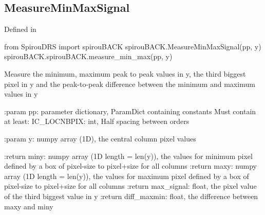 \begin{minipage}{\textwidth}
\subsection{MeasureMinMaxSignal}

Defined in \spirouBACK{}

\begin{pythonbox}
from SpirouDRS import spirouBACK
spirouBACK.MeasureMinMaxSignal(pp, y)
spirouBACK.spirouBACK.measure_min_max(pp, y)
\end{pythonbox}

\begin{pythondocstring}
Measure the minimum, maximum peak to peak values in y, the third biggest
pixel in y and the peak-to-peak difference between the minimum and
maximum values in y

:param pp: parameter dictionary, ParamDict containing constants
            Must contain at least:
                IC_LOCNBPIX: int, Half spacing between orders

:param y: numpy array (1D), the central column pixel values

:return miny: numpy array (1D length = len(y)), the values
              for minimum pixel defined by a box of pixel-size to
              pixel+size for all columns
:return maxy: numpy array (1D length = len(y)), the values
              for maximum pixel defined by a box of pixel-size to
              pixel+size for all columns
:return max_signal: float, the pixel value of the third biggest value
                    in y
:return diff_maxmin: float, the difference between maxy and miny
\end{pythondocstring}
\end{minipage}


